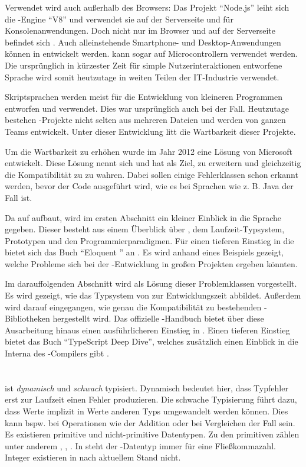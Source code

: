 \documentclass[a4paper]{scrartcl}
\begin{document}
Verwendet wird \js{} auch außerhalb des Browsers:
Das Projekt \enquote{Node.js} leiht sich die \js-Engine \enquote{V8} und verwendet sie auf der Serverseite und für Konsolenanwendungen.
Doch nicht nur im Browser und auf der Serverseite befindet sich \js{}.
Auch alleinstehende Smartphone- und Desktop-Anwendungen können in \js{} entwickelt werden.
\js{} kann sogar auf Microcontrollern verwendet werden.
Die ursprünglich in kürzester Zeit für simple Nutzerinteraktionen entworfene Sprache wird somit heutzutage in weiten Teilen der IT-Industrie verwendet.

Skriptsprachen werden meist für die Entwicklung von kleineren Programmen entworfen und verwendet.
Dies war ursprünglich auch bei \js{} der Fall.
Heutzutage bestehen \js-Projekte nicht selten aus mehreren Dateien und werden von ganzen Teams entwickelt.
Unter dieser Entwicklung litt die Wartbarkeit dieser Projekte.

Um die Wartbarkeit zu erhöhen wurde im Jahr 2012 eine Lösung von Microsoft entwickelt.
Diese Lösung nennt sich \ts{} und hat als Ziel, \js{} zu erweitern und gleichzeitig die Kompatibilität zu \js{} zu wahren.
Dabei sollen einige Fehlerklassen schon erkannt werden, bevor der Code ausgeführt wird, wie es bei Sprachen wie z. B. Java der Fall ist.

Da \ts{} auf \js{} aufbaut, wird im ersten Abschnitt ein kleiner Einblick in die Sprache \js{} gegeben.
Dieser besteht aus einem Überblick über \js{}, dem Laufzeit-Typsystem, Prototypen und den Programmierparadigmen.
Für einen tieferen Einstieg in die \js{} bietet sich das Buch \enquote{Eloquent \js{}} an \cite{eloquent-js}.
Es wird anhand eines Beispiels gezeigt, welche Probleme sich bei der \js-Entwicklung in großen Projekten ergeben könnten.

Im darauffolgenden Abschnitt wird \ts{} als Lösung dieser Problemklassen vorgestellt.
Es wird gezeigt, wie \ts{} das Typsystem von \js{} zur Entwicklungszeit abbildet.
Außerdem wird darauf eingegangen, wie genau die Kompatibilität zu bestehenden \js-Bibliotheken hergestellt wird.
Das offizielle \ts-Handbuch bietet über diese Ausarbeitung hinaus einen ausführlicheren Einstieg in \ts{} \cite{ts-handbook}.
Einen tieferen Einstieg bietet das Buch \enquote{TypeScript Deep Dive}, welches zusätzlich einen Einblick in die Interna des \ts-Compilers gibt \cite{ts-basarat}.

\section{\js{}}\label{sec:js}
\js{} ist \textit{dynamisch} und \textit{schwach} typisiert.
Dynamisch bedeutet hier, dass Typfehler erst zur Laufzeit einen Fehler produzieren.
Die schwache Typisierung führt dazu, dass Werte implizit in Werte anderen Typs umgewandelt werden können.
Dies kann bspw. bei Operationen wie der Addition oder bei Vergleichen der Fall sein.
Es existieren primitive und nicht-primitive Datentypen.
Zu den primitiven zählen unter anderem \tsstring{}, \tsnumber, \tsboolean{}.
In \js{} steht der \tsnumber-Datentyp immer für eine Fließkommazahl.
Integer existieren in \js{} nach aktuellem Stand nicht.
\end{document}
